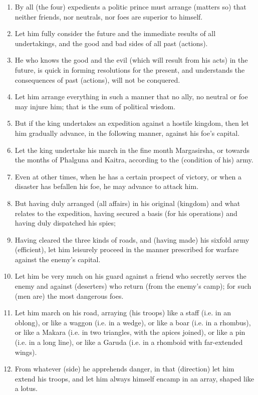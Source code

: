 \begin{enumerate}
\item By all (the four) expedients a politic prince must arrange (matters so) that neither friends, nor neutrals, nor foes are superior to himself.
\item Let him fully consider the future and the immediate results of all undertakings, and the good and bad sides of all past (actions).
\item He who knows the good and the evil (which will result from his acts) in the future, is quick in forming resolutions for the present, and understands the consequences of past (actions), will not be conquered.
\item Let him arrange everything in such a manner that no ally, no neutral or foe may injure him; that is the sum of political wisdom.
\item But if the king undertakes an expedition against a hostile kingdom, then let him gradually advance, in the following manner, against his foe's capital.
\item Let the king undertake his march in the fine month Margasirsha, or towards the months of Phalguna and Kaitra, according to the (condition of his) army.
\item Even at other times, when he has a certain prospect of victory, or when a disaster has befallen his foe, he may advance to attack him.
\item But having duly arranged (all affairs) in his original (kingdom) and what relates to the expedition, having secured a basis (for his operations) and having duly dispatched his spies;
\item Having cleared the three kinds of roads, and (having made) his sixfold army (efficient), let him leisurely proceed in the manner prescribed for warfare against the enemy's capital.
\item Let him be very much on his guard against a friend who secretly serves the enemy and against (deserters) who return (from the enemy's camp); for such (men are) the most dangerous foes.
\item Let him march on his road, arraying (his troops) like a staff (i.e. in an oblong), or like a waggon (i.e. in a wedge), or like a boar (i.e. in a rhombus), or like a Makara (i.e. in two triangles, with the apices joined), or like a pin (i.e. in a long line), or like a Garuda (i.e. in a rhomboid with far-extended wings).
\item From whatever (side) he apprehends danger, in that (direction) let him extend his troops, and let him always himself encamp in an array, shaped like a lotus.

\end{enumerate}
